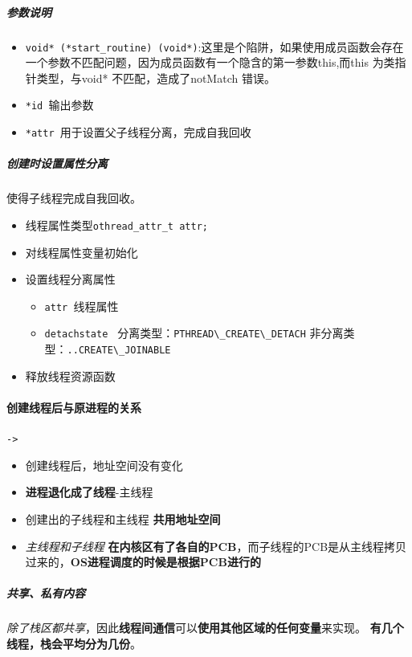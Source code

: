 \documentclass[UTF8,a4paper,12pt]{ctexbook}
\begin{document}
				\subparagraph{参数说明}
					\begin{itemize}[itemindent = 1em]
						\item \verb|void* (*start_routine) (void*)|:这里是个陷阱，如果使用成员函数会存在一个参数不匹配问题，因为成员函数有一个隐含的第一参数this,而this 为类指针类型，与void* 不匹配，造成了notMatch 错误。
						\item \verb|*id |输出参数
						\item \verb|*attr |用于设置父子线程分离，完成自我回收
					\end{itemize}
				
				\subparagraph{创建时设置属性分离}使得子线程完成自我回收。
					\begin{itemize}[itemindent = 1em]
						\item 线程属性类型\verb|othread_attr_t attr;|
						\item 对线程属性变量初始化
						\item 设置线程分离属性
							\begin{itemize}[itemindent = 1em]
								\item \verb|attr |线程属性
								\item \verb|detachstate | 分离类型：\verb|PTHREAD\_CREATE\_DETACH| 非分离类型：\verb|..CREATE\_JOINABLE|
							\end{itemize}
						\item 释放线程资源函数
					\end{itemize}
		\paragraph{创建线程后与原进程的关系}\verb|->|
			\begin{itemize}[itemindent = 1em]
				\item 创建线程后，地址空间没有变化
				\item \textbf{进程退化成了线程}-主线程
				\item 创建出的子线程和主线程 \textbf{共用地址空间}
				\item \textit{主线程和子线程} \textbf{在内核区有了各自的PCB}，而子线程的PCB是从主线程拷贝过来的，\textbf{OS进程调度的时候是根据PCB进行的}
			\end{itemize}	
			
			\subparagraph{共享、私有内容}\textit{除了栈区都共享}，因此\textbf{线程间通信}可以\textbf{使用其他区域的任何变量}来实现。
				\textbf{有几个线程，栈会平均分为几份}。
				
\end{document}
